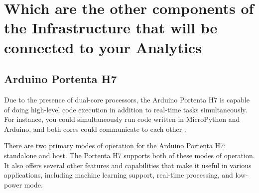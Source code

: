 \chapter{Which are the other components of the Infrastructure that will be connected to your Analytics}

\section{Arduino Portenta H7}

Due to the presence of dual-core processors, the Arduino Portenta H7 is capable of doing high-level code execution in addition to real-time tasks simultaneously. For instance, you could simultaneously run code written in MicroPython and Arduino, and both cores could communicate to each other \cite{ArduinoH72022}. 

\bigskip

There are two primary modes of operation for the Arduino Portenta H7: standalone and host. The Portenta H7 supports both of these modes of operation. It also offers several other features and capabilities that make it useful in various applications, including machine learning support, real-time processing, and low-power mode.

